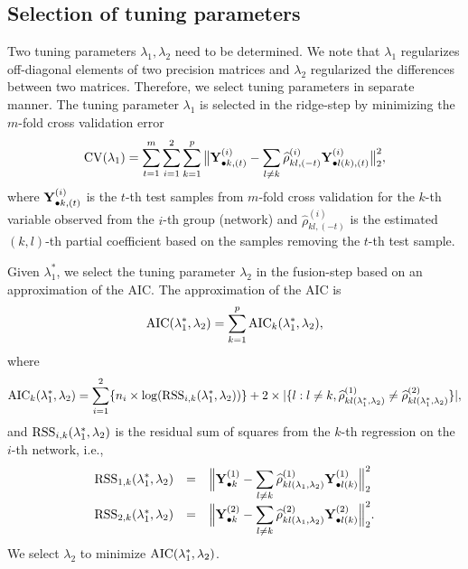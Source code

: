 \documentclass[useAMS,usenatbib,referee]{bio}
\begin{document}
{{\subsection{Selection of tuning parameters}
Two tuning parameters $\lambda_1, \lambda_2$ need to be determined.
We note that $\lambda_1$ regularizes off-diagonal elements of two precision matrices and $\lambda_2$ regularized the differences between two matrices.
Therefore, we select tuning parameters in separate manner.
The tuning parameter $\lambda_1$ is selected in the ridge-step by minimizing the $m$-fold cross validation error
\begin{equation}
{\rm CV}(\lambda_1) = \sum_{t=1}^m \sum_{i=1}^2 \sum_{k=1}^p 
\big\| {\bf Y}^{(i)}_{\bullet k,(t)} - \sum_{l \neq k} \widehat{\rho}^{(i)}_{kl,(-t)} {\bf Y}^{(i)}_{\bullet l(k),(t)} \big\|_2^2, 
\end{equation}
where ${\bf Y}^{(i)}_{\bullet k,(t)}$ is the $t$-th test samples from $m$-fold cross validation for the $k$-th variable observed from the $i$-th group (network) and $\widehat{\rho}^{(i)}_{kl,(-t)} $ is the estimated $(k,l)$-th partial coefficient based on the samples removing the $t$-th test sample. 


Given $\lambda_1^*$, we select the tuning parameter $\lambda_2$ in the fusion-step based on an approximation of the AIC. 
The approximation of the AIC is
\begin{equation} \nonumber
{\rm AIC}(\lambda_1^*,\lambda_2)=\sum_{k=1}^{p} {\rm AIC}_k(\lambda_1^*,\lambda_2),
\end{equation}
where
\begin{equation}\label{AIC}
{\rm AIC}_k(\lambda_1^*,\lambda_2) = \sum_{i=1}^2 \{ n_i \times
\log({\rm RSS}_{i,k}(\lambda_1^*,\lambda_2)) \} + 2 \times |\{l: l \neq k
,\widehat{\rho}_{kl (\lambda_1^*,\lambda_2)}^{(1)}\neq \widehat{\rho}_{kl (\lambda_1^*,\lambda_2)}^{(2)}\}|,
\end{equation}
and ${\rm RSS}_{i,k}(\lambda_1^*,\lambda_2)$ is the residual sum of squares from the $k$-th regression on the $i$-th network, i.e.,
\begin{equation}\nonumber
\begin{array}{rcl} \displaystyle
{\rm RSS}_{1,k}(\lambda_1^*,\lambda_2) &=& \displaystyle\Big\| \mathbf{Y}^{(1)}_{\bullet k} -
\sum_{l \neq k}\widehat{\rho}_{kl(\lambda_1,\lambda_2)}^{(1)}
\mathbf{Y}_{\bullet l(k)}^{(1)} \Big\|_2^2 \\
{\rm RSS}_{2,k}(\lambda_1^*,\lambda_2) &=& \displaystyle\Big\| \mathbf{Y}_{\bullet k}^{(2)} -
\sum_{l \neq k} \widehat{\rho}_{kl (\lambda_1,\lambda_2)}^{(2)} \mathbf{Y}_{\bullet l(k)}^{(2)}
\Big\|_2^2.
\end{array}
\end{equation}
We select $\lambda_2$  to minimize ${\rm AIC}(\lambda_1^*,\lambda_2)$.


}}
\end{document}
